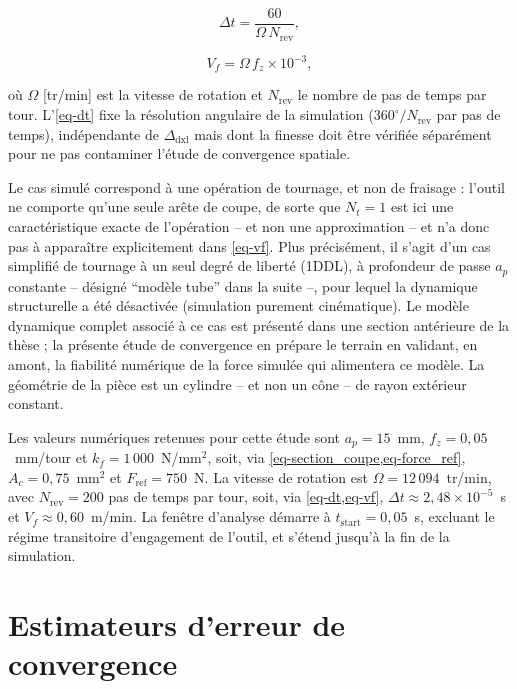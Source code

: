 \documentclass[
    11pt,
    a4paper
]{article}
\newcommand{\ap}{a_p}
\newcommand{\fz}{f_z}
\newcommand{\kf}{k_f}
\newcommand{\Ac}{A_c}
\newcommand{\Fref}{F_{\mathrm{ref}}}
\newcommand{\dxlsize}{\Delta_{\mathrm{dxl}}}
\begin{document}
\begin{equation}
    \Delta t = \frac{60}{\Omega \, N_{\mathrm{rev}}},
    \label{eq-dt}
\end{equation}

\begin{equation}
    V_f = \Omega \, \fz \times 10^{-3},
    \label{eq-vf}
\end{equation}

où \(\Omega\) [tr/min] est la vitesse de rotation et \(N_{\mathrm{rev}}\) le nombre de pas
de temps par tour. L'{}\cref{eq-dt} fixe la résolution angulaire de la simulation
(\(360^\circ/N_{\mathrm{rev}}\) par pas de temps), indépendante de \(\dxlsize\) mais dont la
finesse doit être vérifiée séparément pour ne pas contaminer l'étude de convergence
spatiale.

Le cas simulé correspond à une opération de tournage, et non de fraisage : l'outil ne
comporte qu'une seule arête de coupe, de sorte que \(N_t=1\) est ici une caractéristique
exacte de l'opération -- et non une approximation -- et n'a donc pas à apparaître
explicitement dans \cref{eq-vf}. Plus précisément, il s'agit d'un cas simplifié de
tournage à un seul degré de liberté (1DDL), à profondeur de passe \(\ap\) constante --
désigné \enquote{modèle tube} dans la suite --, pour lequel la dynamique structurelle a été
désactivée (simulation purement cinématique). Le
modèle dynamique complet associé à ce cas est présenté dans une section antérieure de la
thèse ; la présente étude de convergence en prépare le terrain en validant, en amont, la
fiabilité numérique de la force simulée qui alimentera ce modèle. La géométrie de la pièce
est un cylindre -- et non un cône -- de rayon extérieur constant.

Les valeurs numériques retenues pour cette étude sont \(\ap = 15\)~mm,
\(\fz = 0,05\)~mm/tour et \(\kf = 1\,000\)~N/mm\(^2\), soit, via
\cref{eq-section_coupe,eq-force_ref}, \(\Ac = 0,75\)~mm\(^2\) et \(\Fref = 750\)~N. La
vitesse de rotation est \(\Omega = 12\,094\)~tr/min, avec \(N_{\mathrm{rev}} = 200\) pas de
temps par tour, soit, via \cref{eq-dt,eq-vf}, \(\Delta t \approx 2,48\times10^{-5}\)~s et
\(V_f \approx 0,60\)~m/min. La fenêtre d'analyse démarre à
\(t_{\mathrm{start}} = 0,05\)~s, excluant le régime transitoire d'engagement de l'outil, et
s'étend jusqu'à la fin de la simulation.

\section{Estimateurs d'erreur de convergence}
\label{sec-estimateurs_erreur}
\end{document}
